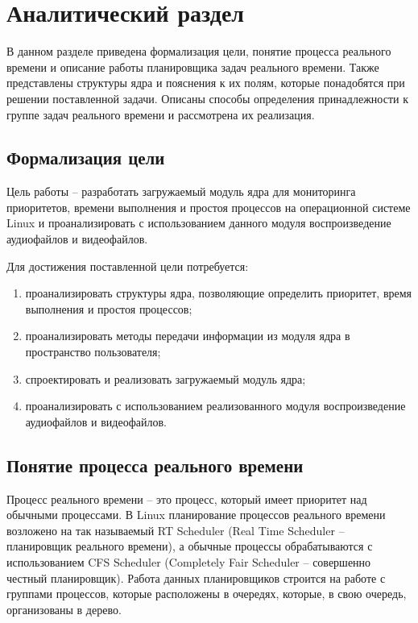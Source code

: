 \section{Аналитический раздел}
В данном разделе приведена формализация цели, понятие процесса реального времени и описание работы планировщика задач реального времени. Также представлены структуры ядра и пояснения к их полям, которые понадобятся при решении поставленной задачи. Описаны способы определения принадлежности к группе задач реального времени и рассмотрена их реализация.

\subsection{Формализация цели}
Цель работы -- разработать загружаемый модуль ядра для мониторинга приоритетов, времени выполнения и простоя процессов на операционной системе Linux и проанализировать с использованием данного модуля воспроизведение аудиофайлов и видеофайлов.

Для достижения поставленной цели потребуется:
\begin{enumerate}[leftmargin=1.6\parindent]
\item проанализировать структуры ядра, позволяющие определить приоритет, время выполнения и простоя процессов;
\item проанализировать методы передачи информации из модуля ядра в пространство пользователя;
\item спроектировать и реализовать загружаемый модуль ядра;
\item проанализировать с использованием реализованного модуля воспроизведение аудиофайлов и видеофайлов.
\end{enumerate}

\subsection{Понятие процесса реального времени}
Процесс реального времени -- это процесс, который имеет приоритет над обычными процессами. В Linux планирование процессов реального времени возложено на так называемый RT Scheduler (Real Time Scheduler -- планировщик реального времени), а обычные процессы обрабатываются с использованием CFS Scheduler (Completely Fair Scheduler -- совершенно честный планировщик). Работа данных планировщиков строится на работе с группами процессов, которые расположены в очередях, которые, в свою очередь, организованы в дерево. \cite{realtimeprocesses}

